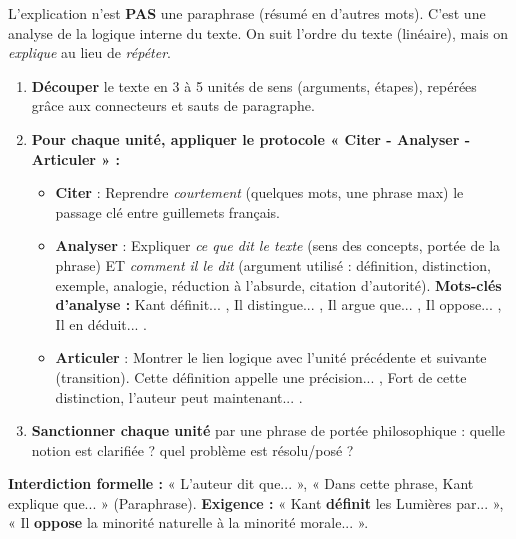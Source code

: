 \documentclass[11pt]{article}
\newcommand{\cle}[1]{{\popxbold\color{popdark}#1}}
\begin{document}
\begin{methode}
    L'explication n'est \textbf{PAS} une paraphrase (résumé en d'autres mots). C'est une \cle{analyse de la logique interne} du texte. On suit l'ordre du texte (linéaire), mais on \emph{explique} au lieu de \emph{répéter}.
    \begin{enumerate}
        \item \textbf{Découper} le texte en 3 à 5 \cle{unités de sens} (arguments, étapes), repérées grâce aux connecteurs et sauts de paragraphe.
        \item \textbf{Pour chaque unité, appliquer le protocole « Citer - Analyser - Articuler » :}
              \begin{itemize}
                  \item \textbf{Citer} : Reprendre \emph{courtement} (quelques mots, une phrase max) le passage clé entre guillemets français.
                  \item \textbf{Analyser} : Expliquer \emph{ce que dit le texte} (sens des concepts, portée de la phrase) ET \emph{comment il le dit} (argument utilisé : définition, distinction, exemple, analogie, réduction à l'absurde, citation d'autorité). \textbf{Mots-clés d'analyse :} \guillemotleft Kant définit... \guillemotright, \guillemotleft Il distingue... \guillemotright, \guillemotleft Il argue que... \guillemotright, \guillemotleft Il oppose... \guillemotright, \guillemotleft Il en déduit... \guillemotright.
                  \item \textbf{Articuler} : Montrer le lien logique avec l'unité précédente et suivante (transition). \guillemotleft Cette définition appelle une précision... \guillemotright, \guillemotleft Fort de cette distinction, l'auteur peut maintenant... \guillemotright.
              \end{itemize}
        \item \textbf{Sanctionner chaque unité} par une phrase de \cle{portée philosophique} : quelle notion est clarifiée ? quel problème est résolu/posé ?
    \end{enumerate}
    \textbf{Interdiction formelle :} « L'auteur dit que... », « Dans cette phrase, Kant explique que... » (Paraphrase). \textbf{Exigence :} « Kant \textbf{définit} les Lumières par... », « Il \textbf{oppose} la minorité naturelle à la minorité morale... ».
\end{methode}
\end{document}
